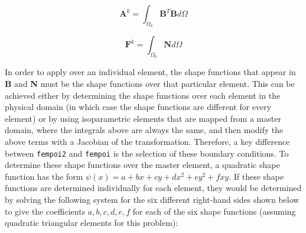 \documentclass[10pt]{article}
\newcommand{\beq}{\begin{equation}}
\newcommand{\eeq}{\end{equation}}
\begin{document}
\beq
\label{eq:20}
\textbf{A}^k=\int_{\Omega_k} \textbf{B}^T\textbf{B}d\Omega
\eeq

\beq
\label{eq:21}
\textbf{F}^k=\int_{\Omega_k} \textbf{N}d\Omega
\eeq

In order to apply over an individual element, the shape functions that appear in \textbf{B} and \textbf{N} must be the shape functions over that particular element. This can be achieved either by determining the shape functions over each element in the physical domain (in which case the shape functions are different for every element) or by using isoparametric elements that are mapped from a master domain, where the integrals above are always the same, and then modify the above terms with a Jacobian of the transformation. Therefore, a key difference between {\tt fempoi2} and {\tt fempoi} is the selection of these boundary conditions. To determine these shape functions over the master element, a quadratic shape function has the form \(\psi(x)=a+bx+cy+dx^2+ey^2+fxy\). If these shape functions are determined individually for each element, they would be determined by solving the following system for the six different right-hand sides shown below to give the coefficients \(a, b, c, d, e, f\) for each of the six shape functions (assuming quadratic triangular elements for this problem):
\end{document}
